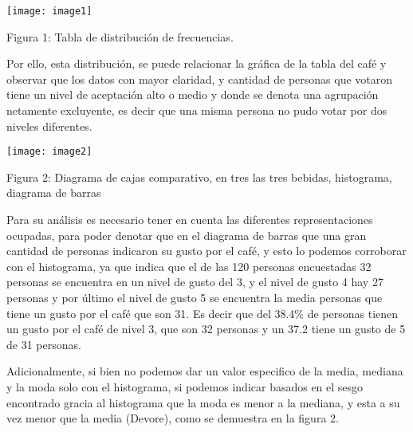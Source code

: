 \documentclass{article} %
\begin{document}
\noindent 

\noindent 

\noindent 

\noindent 

\noindent 

\noindent 

\noindent \texttt{[image: image1]}

\noindent 

\noindent 

\noindent 

\noindent 

\noindent 

\noindent 

\noindent Figura 1: Tabla de distribuci\'{o}n de frecuencias.

\noindent 

\noindent Por ello, esta distribuci\'{o}n, se puede relacionar la gr\'{a}fica de la tabla del caf\'{e} y observar que los datos con mayor claridad, y cantidad de personas que votaron tiene un nivel de aceptaci\'{o}n alto o medio y donde se denota una agrupaci\'{o}n netamente excluyente, es decir que una misma persona no pudo votar por dos niveles diferentes. 

\noindent 

\noindent \texttt{[image: image2]}

\noindent Figura 2: Diagrama de cajas comparativo, en tres las tres bebidas, histograma, diagrama de barras 

\noindent 

\noindent Para su an\'{a}lisis es necesario tener en cuenta las diferentes representaciones ocupadas, para poder denotar que en el diagrama de barras que una gran cantidad de personas indicaron su gusto por el caf\'{e}, y esto lo podemos corroborar con el histograma, ya que indica que el de las 120 personas encuestadas 32 personas se encuentra en un nivel de gusto del 3, y el nivel de gusto 4 hay 27 personas y por \'{u}ltimo el nivel de gusto 5 se encuentra la media personas que tiene un gusto por el caf\'{e} que son 31.  Es decir que del 38.4\% de personas tienen un gusto por el caf\'{e} de nivel 3, que son 32 personas y un 37.2 tiene un gusto de 5 de 31 personas. 

\noindent Adicionalmente, si bien no podemos dar un valor especifico de la media, mediana y la moda solo con el histograma, si podemos indicar basados en el sesgo encontrado gracia al histograma que la moda es menor a la mediana, y esta a su vez menor que la media (Devore), como se demuestra en la figura 2.
\end{document}

